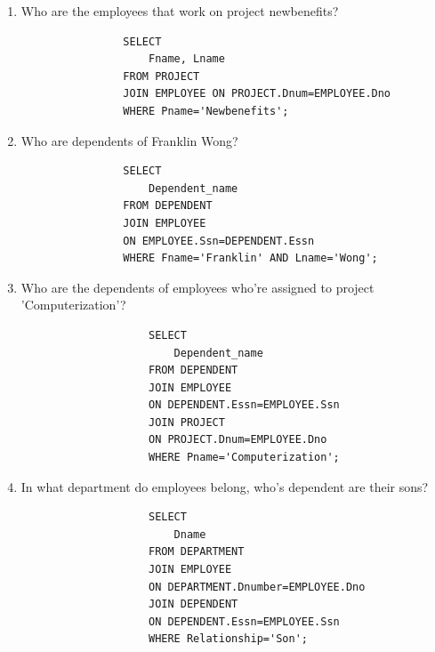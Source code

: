 \documentclass[12pt,titlepage]{article}
\begin{document}
\begin{enumerate}[label=\Alph*.]
{\begin{enumerate}[label={\arabic*.}]
{                \begin{verbatim}
                SELECT
                    Fname, Lname
                FROM DEPARTMENT
                JOIN EMPLOYEE 
                ON DEPARTMENT.Mgr_ssn=EMPLOYEE.Ssn
                WHERE Dname='Research';
                \end{verbatim}
            }
            \item {
                Who are the employees that work on project newbenefits?

                \begin{verbatim}
                SELECT
                    Fname, Lname
                FROM PROJECT
                JOIN EMPLOYEE ON PROJECT.Dnum=EMPLOYEE.Dno
                WHERE Pname='Newbenefits';
                \end{verbatim}
            }
            \item {
                Who are dependents of Franklin Wong?

                \begin{verbatim}
                SELECT
                    Dependent_name
                FROM DEPENDENT
                JOIN EMPLOYEE
                ON EMPLOYEE.Ssn=DEPENDENT.Essn
                WHERE Fname='Franklin' AND Lname='Wong';
                \end{verbatim}
            }
            \item {
                Who are the dependents of employees who're assigned to project 'Computerization'?

                \begin{verbatim}
                    SELECT
                        Dependent_name
                    FROM DEPENDENT
                    JOIN EMPLOYEE
                    ON DEPENDENT.Essn=EMPLOYEE.Ssn
                    JOIN PROJECT
                    ON PROJECT.Dnum=EMPLOYEE.Dno
                    WHERE Pname='Computerization';
                \end{verbatim}
            }
            \item {
                In what department do employees belong, who's dependent are their sons?

                \begin{verbatim}
                    SELECT
                        Dname
                    FROM DEPARTMENT
                    JOIN EMPLOYEE
                    ON DEPARTMENT.Dnumber=EMPLOYEE.Dno
                    JOIN DEPENDENT
                    ON DEPENDENT.Essn=EMPLOYEE.Ssn
                    WHERE Relationship='Son';
                \end{verbatim}
            }
        \end{enumerate}
    }
\end{enumerate}
\end{document}
